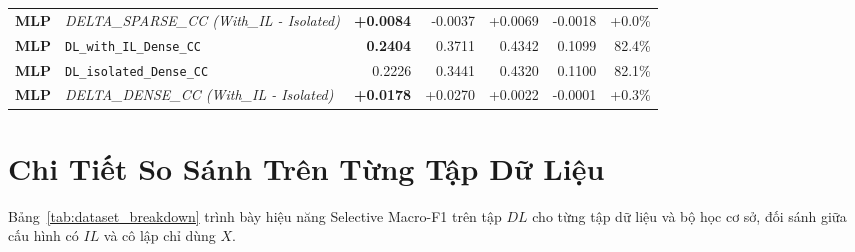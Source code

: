 \documentclass[11pt,a4paper]{article}
\begin{document}
\begin{table}[htbp]
{\begin{tabular}{l l r r r r r}
\textbf{MLP} & \textit{DELTA\_SPARSE\_CC (With\_IL - Isolated)} & \textbf{+0.0084} & -0.0037 & +0.0069 & -0.0018 & +0.0\% \\
\textbf{MLP} & \texttt{DL\_with\_IL\_Dense\_CC} & \textbf{0.2404} & 0.3711 & 0.4342 & 0.1099 & 82.4\% \\
\textbf{MLP} & \texttt{DL\_isolated\_Dense\_CC} & 0.2226 & 0.3441 & 0.4320 & 0.1100 & 82.1\% \\
\textbf{MLP} & \textit{DELTA\_DENSE\_CC (With\_IL - Isolated)} & \textbf{+0.0178} & +0.0270 & +0.0022 & -0.0001 & +0.3\% \\
\bottomrule
\end{tabular}%
}
\end{table}

\section{Chi Tiết So Sánh Trên Từng Tập Dữ Liệu}
Bảng~\ref{tab:dataset_breakdown} trình bày hiệu năng Selective Macro-F1 trên tập $DL$ cho từng tập dữ liệu và bộ học cơ sở, đối sánh giữa cấu hình có $IL$ và cô lập chỉ dùng $X$.
\end{document}
